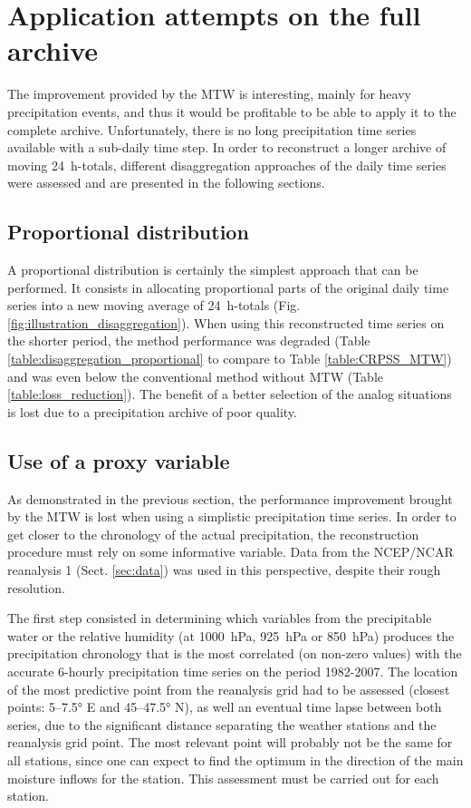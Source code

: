 \documentclass[hess, manuscript]{copernicus}
\begin{document}
\section{Application attempts on the full archive}
\label{sec:attempts}

The improvement provided by the MTW is interesting, mainly for heavy precipitation events, and thus it would be profitable to be able to apply it to the complete archive. Unfortunately, there is no long precipitation time series available with a sub-daily time step. In order to reconstruct a longer archive of moving 24~h-totals, different disaggregation approaches of the daily time series were assessed and are presented in the following sections.

\subsection{Proportional distribution}

A proportional distribution is certainly the simplest approach that can be performed. It consists in allocating proportional parts of the original daily time series into a new moving average of 24~h-totals (Fig. \ref{fig:illustration_disaggregation}). When using this reconstructed time series on the shorter period, the method performance was degraded (Table \ref{table:disaggregation_proportional} to compare to Table \ref{table:CRPSS_MTW}) and was even below the conventional method without MTW (Table \ref{table:loss_reduction}). The benefit of a better selection of the analog situations is lost due to a precipitation archive of poor quality.


\subsection{Use of a proxy variable}

As demonstrated in the previous section, the performance improvement brought by the MTW is lost when using a simplistic precipitation time series. In order to get closer to the chronology of the actual precipitation, the reconstruction procedure must rely on some informative variable. Data from the NCEP/NCAR reanalysis 1 (Sect. \ref{sec:data}) was used in this perspective, despite their rough resolution. 

The first step consisted in determining which variables from the precipitable water or the relative humidity (at 1000~hPa, 925~hPa or 850~hPa) produces the precipitation chronology that is the most correlated (on non-zero values) with the accurate 6-hourly precipitation time series on the period 1982-2007. The location of the most predictive point from the reanalysis grid had to be assessed (closest points: 5--7.5° E and 45--47.5° N), as well an eventual time lapse between both series, due to the significant distance separating the weather stations and the reanalysis grid point. The most relevant point will probably not be the same for all stations, since one can expect to find the optimum in the direction of the main moisture inflows for the station. This assessment must be carried out for each station. 
\end{document}
